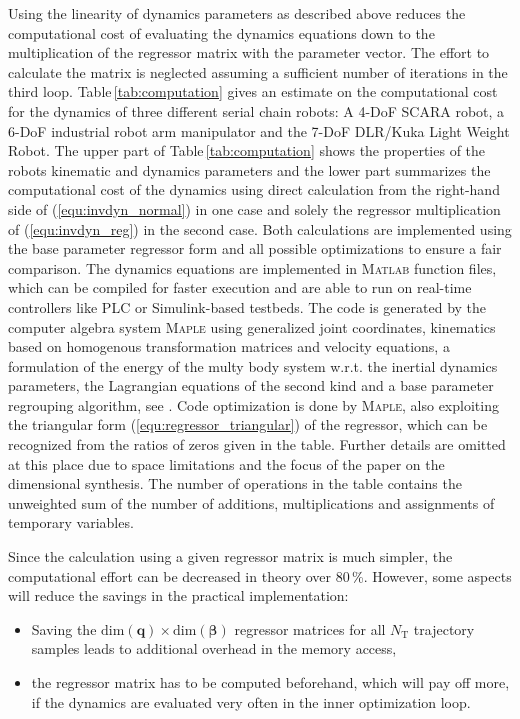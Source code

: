 \documentclass{svproc}
\newcommand{\bm}[1]{\boldsymbol{#1}}
\begin{document}
Using the linearity of dynamics parameters as described above reduces the computational cost of evaluating the dynamics equations down to the multiplication of the regressor matrix with the parameter vector.
The effort to calculate the matrix is neglected assuming a sufficient number of iterations in the third loop.
Table\,\ref{tab:computation} gives an estimate on the computational cost for the dynamics of three different serial chain robots: A 4-DoF SCARA robot, a 6-DoF industrial robot arm manipulator and the 7-DoF DLR/Kuka Light Weight Robot.
The upper part of Table\,\ref{tab:computation} shows the properties of the robots kinematic and dynamics parameters and the lower part summarizes the computational cost of the dynamics using direct calculation from the right-hand side of (\ref{equ:invdyn_normal}) in one case and solely the regressor multiplication of (\ref{equ:invdyn_reg}) in the second case.
Both calculations are implemented using the base parameter regressor form and all possible optimizations to ensure a fair comparison.
The dynamics equations are implemented in \textsc{Matlab} function files, which can be compiled for faster execution and are able to run on real-time controllers like PLC or Simulink-based testbeds.
The code is generated by the computer algebra system \textsc{Maple} using generalized joint coordinates, kinematics based on homogenous transformation matrices and velocity equations, a formulation of the energy of the multy body system w.r.t. the inertial dynamics parameters, the Lagrangian equations of the second kind and a base parameter regrouping algorithm, see \cite{KhalilDom2002}.
Code optimization is done by \textsc{Maple}, also exploiting the triangular form (\ref{equ:regressor_triangular}) of the regressor, which can be recognized from the ratios of zeros given in the table.
Further details are omitted at this place due to space limitations and the focus of the paper on the dimensional synthesis.
The number of operations in the table contains the unweighted sum of the number of additions, multiplications and assignments of temporary variables.

Since the calculation using a given regressor matrix is much simpler, the computational effort can be decreased in theory over 80\,\%.
However, some aspects will reduce the savings in the practical implementation:
\begin{itemize} 
\item Saving the $\mathrm{dim}(\bm{q}) \times \mathrm{dim}(\bm{\beta})$ regressor matrices for all $N_\mathrm{T}$ trajectory samples leads to additional overhead in the memory access,
\item the regressor matrix has to be computed beforehand, which will pay off more, if the dynamics are evaluated very often in the inner optimization loop.
\end{itemize}  
\end{document}
